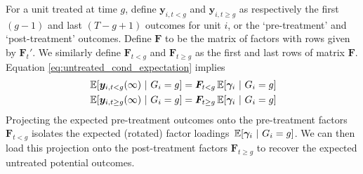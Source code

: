 \documentclass[12pt]{article}
\begin{document}


For a unit treated at time $g$, define $\bm y_{i,t<g}$ and $\bm y_{i,t\geq g}$ as respectively the first $(g-1)$ and last $(T-g+1)$ outcomes for unit $i$, or the `pre-treatment' and `post-treatment' outcomes. Define $\bm{F}$ to be the matrix of factors with rows given by $\bm{F}_t'$. We similarly define $\bm{F}_{t < g}$ and $\bm{F}_{t \geq g}$ as the first and last rows of matrix $\bm{F}$. Equation \eqref{eq:untreated_cond_expectation} implies
\begin{gather}
    \expec{\bm y_{i,t < g}(\infty)}{ G_i = g} = \bm{F}_{t < g} \expec{\bm \gamma_i}{G_i = g}\\
    \expec{\bm y_{i,t \geq g}(\infty)}{ G_i = g} = \bm{F}_{t \geq g} \expec{\bm \gamma_i}{G_i = g}
\end{gather}
Projecting the expected pre-treatment outcomes onto the pre-treatment factors $\bm F_{t < g}$ isolates the expected (rotated) factor loadings $\expec{\bm \gamma_i}{G_i = g}$. We can then load this projection onto the post-treatment factors $\bm F_{t \geq g}$ to recover the expected untreated potential outcomes. 
\end{document}
